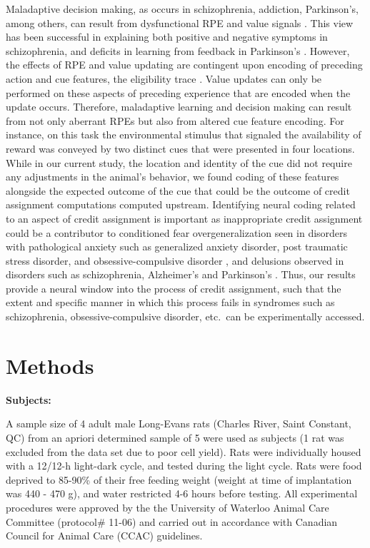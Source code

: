 \documentclass[11pt]{article}
\let\cite=\citep
\begin{document}
Maladaptive decision making, as occurs in schizophrenia, addiction,
Parkinson's, among others, can result from dysfunctional RPE and value
signals \cite{Frank2004,Gradin2011,Maia2011}. This view has been
successful in explaining both positive and negative symptoms in
schizophrenia, and deficits in learning from feedback in Parkinson's
\cite{Frank2004,Gradin2011}. However, the effects of RPE and value
updating are contingent upon encoding of preceding action and cue
features, the eligibility trace \cite{sutton1998,Lee2012}. Value
updates can only be performed on these aspects of preceding experience
that are encoded when the update occurs. Therefore, maladaptive
learning and decision making can result from not only aberrant RPEs
but also from altered cue feature encoding. For instance, on this task
the environmental stimulus that signaled the availability of reward
was conveyed by two distinct cues that were presented in four
locations. While in our current study, the location and identity of
the cue did not require any adjustments in the animal’s behavior, we
found coding of these features alongside the expected outcome of the
cue that could be the outcome of credit assignment computations
computed upstream. Identifying neural coding related to an aspect of
credit assignment is important as inappropriate credit assignment
could be a contributor to conditioned fear overgeneralization seen in
disorders with pathological anxiety such as generalized anxiety
disorder, post traumatic stress disorder, and obsessive-compulsive
disorder \cite{Kaczkurkin2013,Lissek2014,Kaczkurkin2017}, and
delusions observed in disorders such as schizophrenia, Alzheimer's and
Parkinson's \cite{Kapur2003,Corlett2010}. Thus, our results provide a
neural window into the process of credit assignment, such that the
extent and specific manner in which this process fails in syndromes such as schizophrenia, obsessive-compulsive disorder,
etc.\ can be experimentally accessed.

\section*{Methods}

{\bf Subjects:}

A sample size of 4 adult male Long-Evans rats (Charles River, Saint Constant, QC) from an apriori determined sample of 5 
were used as subjects (1 rat was excluded from the data set due to poor cell yield). Rats were individually housed with a 12/12-h
light-dark cycle, and tested during the light cycle. Rats were food
deprived to 85-90\% of their free feeding weight (weight at time of
implantation was 440 - 470 g), and water restricted 4-6 hours before
testing. All experimental procedures were approved by the the
University of Waterloo Animal Care Committee (protocol\# 11-06) and
carried out in accordance with Canadian Council for Animal Care (CCAC)
guidelines.
\end{document}
